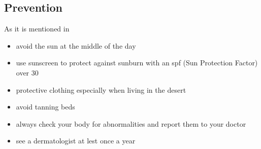     \subsection{Prevention}
        As it is mentioned in ~\cite{mayo2020, scfp2022} 
        \begin{itemize}
        \item avoid the sun at the middle of the day
        \item use sunscreen to protect against sunburn with an spf (Sun Protection Factor) over 30
        \item protective clothing especially when living in the desert
        \item avoid tanning beds
        \item always check your body for abnormalities and report them to your doctor
        \item see a dermatologist at lest once a year
        \end{itemize}


